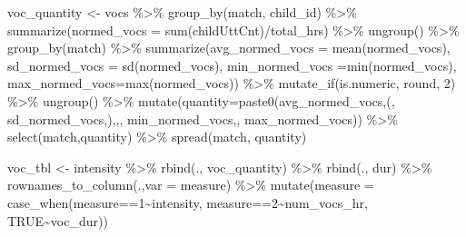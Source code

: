 \documentclass[
]{article}
\newenvironment{Shaded}{\begin{snugshade}}{\end{snugshade}}
\newcommand{\AttributeTok}[1]{\textcolor[rgb]{0.77,0.63,0.00}{#1}}
\newcommand{\ConstantTok}[1]{\textcolor[rgb]{0.00,0.00,0.00}{#1}}
\newcommand{\DecValTok}[1]{\textcolor[rgb]{0.00,0.00,0.81}{#1}}
\newcommand{\FunctionTok}[1]{\textcolor[rgb]{0.00,0.00,0.00}{#1}}
\newcommand{\NormalTok}[1]{#1}
\newcommand{\OtherTok}[1]{\textcolor[rgb]{0.56,0.35,0.01}{#1}}
\newcommand{\SpecialCharTok}[1]{\textcolor[rgb]{0.00,0.00,0.00}{#1}}
\newcommand{\StringTok}[1]{\textcolor[rgb]{0.31,0.60,0.02}{#1}}
\begin{document}
\begin{Shaded}
\begin{Highlighting}[]
\NormalTok{voc\_quantity }\OtherTok{\textless{}{-}}\NormalTok{ vocs }\SpecialCharTok{\%\textgreater{}\%}
  \FunctionTok{group\_by}\NormalTok{(match, child\_id) }\SpecialCharTok{\%\textgreater{}\%}
  \FunctionTok{summarize}\NormalTok{(}\AttributeTok{normed\_vocs =} \FunctionTok{sum}\NormalTok{(childUttCnt)}\SpecialCharTok{/}\NormalTok{total\_hrs) }\SpecialCharTok{\%\textgreater{}\%}
  \FunctionTok{ungroup}\NormalTok{() }\SpecialCharTok{\%\textgreater{}\%}
  \FunctionTok{group\_by}\NormalTok{(match) }\SpecialCharTok{\%\textgreater{}\%}
  \FunctionTok{summarize}\NormalTok{(}\AttributeTok{avg\_normed\_vocs =} \FunctionTok{mean}\NormalTok{(normed\_vocs),}
            \AttributeTok{sd\_normed\_vocs =} \FunctionTok{sd}\NormalTok{(normed\_vocs),}
            \AttributeTok{min\_normed\_vocs =}\FunctionTok{min}\NormalTok{(normed\_vocs),}
            \AttributeTok{max\_normed\_vocs=}\FunctionTok{max}\NormalTok{(normed\_vocs)) }\SpecialCharTok{\%\textgreater{}\%}
  \FunctionTok{mutate\_if}\NormalTok{(is.numeric, round, }\DecValTok{2}\NormalTok{) }\SpecialCharTok{\%\textgreater{}\%}
  \FunctionTok{ungroup}\NormalTok{() }\SpecialCharTok{\%\textgreater{}\%}
  \FunctionTok{mutate}\NormalTok{(}\AttributeTok{quantity=}\FunctionTok{paste0}\NormalTok{(avg\_normed\_vocs,}\StringTok{\textquotesingle{}(\textquotesingle{}}\NormalTok{,}
\NormalTok{                         sd\_normed\_vocs,}\StringTok{\textquotesingle{})\textquotesingle{}}\NormalTok{,}\StringTok{\textquotesingle{},\textquotesingle{}}\NormalTok{,}
\NormalTok{                         min\_normed\_vocs,}\StringTok{\textquotesingle{}{-}\textquotesingle{}}\NormalTok{,}
\NormalTok{                         max\_normed\_vocs)) }\SpecialCharTok{\%\textgreater{}\%}
  \FunctionTok{select}\NormalTok{(match,quantity) }\SpecialCharTok{\%\textgreater{}\%}
  \FunctionTok{spread}\NormalTok{(match, quantity) }

\NormalTok{voc\_tbl }\OtherTok{\textless{}{-}}\NormalTok{ intensity }\SpecialCharTok{\%\textgreater{}\%}
  \FunctionTok{rbind}\NormalTok{(., voc\_quantity) }\SpecialCharTok{\%\textgreater{}\%}
  \FunctionTok{rbind}\NormalTok{(., dur) }\SpecialCharTok{\%\textgreater{}\%}
  \FunctionTok{rownames\_to\_column}\NormalTok{(.,}\AttributeTok{var =} \StringTok{\textquotesingle{}measure\textquotesingle{}}\NormalTok{) }\SpecialCharTok{\%\textgreater{}\%}
  \FunctionTok{mutate}\NormalTok{(}\AttributeTok{measure =} \FunctionTok{case\_when}\NormalTok{(measure}\SpecialCharTok{==}\StringTok{\textquotesingle{}1\textquotesingle{}}\SpecialCharTok{\textasciitilde{}}\StringTok{\textquotesingle{}intensity\textquotesingle{}}\NormalTok{,}
\NormalTok{            measure}\SpecialCharTok{==}\StringTok{\textquotesingle{}2\textquotesingle{}}\SpecialCharTok{\textasciitilde{}}\StringTok{\textquotesingle{}num\_vocs\_hr\textquotesingle{}}\NormalTok{,}
            \ConstantTok{TRUE}\SpecialCharTok{\textasciitilde{}}\StringTok{\textquotesingle{}voc\_dur\textquotesingle{}}\NormalTok{))}
\end{Highlighting}
\end{Shaded}
\end{document}
